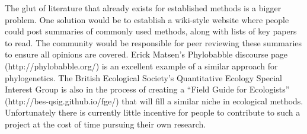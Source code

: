 \documentclass[a4paper,12pt]{article}
\begin{document}
    The glut of literature that already exists for established methods is a bigger problem. 
    One solution would be to establish a wiki-style website where people could post summaries of commonly used methods, along with lists of key papers to read. 
    The community would be responsible for peer reviewing these summaries to ensure all opinions are covered. 
    Erick Matsen's Phylobabble discourse page (http://phylobabble.org/) is an excellent example of a similar approach for phylogenetics. 
    The British Ecological Society's Quantitative Ecology Special Interest Group is also in the process of creating a ``Field Guide for Ecologists'' (http://bes-qsig.github.io/fge/) that will fill a similar niche in ecological methods.
    Unfortunately there is currently little incentive for people to contribute to such a project at the cost of time pursuing their own research.\\

\end{document}
